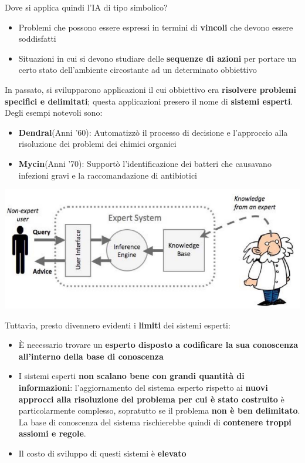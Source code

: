 \documentclass[12pt]{article}
\begin{document}
Dove si applica quindi l'IA di tipo simbolico?
\begin{itemize}
    \item Problemi che possono essere espressi in termini di \textbf{vincoli} che devono essere soddisfatti
    \item Situazioni in cui si devono studiare delle \textbf{sequenze di azioni} per portare un certo stato dell'ambiente circostante ad un determinato obbiettivo
\end{itemize}
In passato, si svilupparono applicazioni il cui obbiettivo era \textbf{risolvere problemi specifici e delimitati}; questa applicazioni presero il nome di \textbf{sistemi esperti}.
Degli esempi notevoli sono:
\begin{itemize}
    \item \textbf{Dendral}(Anni '60): Automatizzò il processo di decisione e l'approccio alla risoluzione dei problemi dei chimici organici
    \item \textbf{Mycin}(Anni '70): Supportò  l'identificazione dei batteri che causavano infezioni gravi e la raccomandazione di antibiotici 
\end{itemize}
\begin{center}
    \includegraphics[width = 0.80\linewidth]{Images/3.PNG}
\end{center}
Tuttavia, presto divennero evidenti i \textbf{limiti} dei sistemi esperti:
\begin{itemize}
    \item È necessario trovare un \textbf{esperto disposto a codificare la sua conoscenza all'interno della base di conoscenza}
    \item I sistemi esperti \textbf{non scalano bene con grandi quantità di informazioni}: l'aggiornamento del sistema esperto rispetto ai \textbf{nuovi approcci alla risoluzione del problema per cui è stato costruito} è particolarmente complesso, sopratutto se il problema \textbf{non è ben delimitato}. La base di conoscenza del sistema rischierebbe quindi di \textbf{contenere troppi assiomi e regole}.
    \item Il costo di sviluppo di questi sistemi è \textbf{elevato}
\end{itemize}
\end{document}

